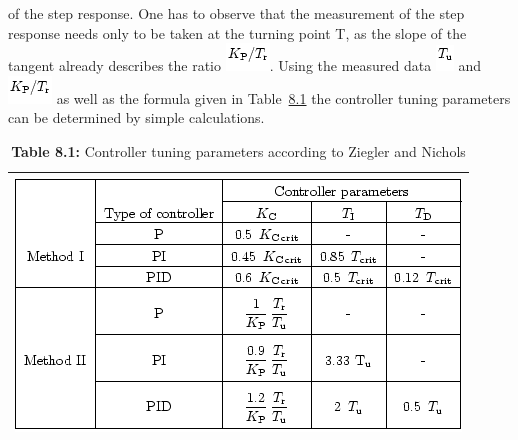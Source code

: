 \documentclass[]{article}
\begin{document}
\begin{description}
of the step response. One has to observe that the measurement of the
step response needs only to be taken at the turning point T, as the
slope of the tangent already describes the ratio
\includegraphics[width=0.45833in,height=0.29167in]{./Empirical tuning rules according to Ziegler and Nichols_files/img1248.png}.
Using the measured data
\includegraphics[width=0.18750in,height=0.27083in]{./Empirical tuning rules according to Ziegler and Nichols_files/img64.png}
and
\includegraphics[width=0.45833in,height=0.29167in]{./Empirical tuning rules according to Ziegler and Nichols_files/img1248.png}
as well as the formula given in
Table~\href{http://www.atp.ruhr-uni-bochum.de/rt1/syscontrol/node64.html\#tab:8.2.8}{8.1}
the controller tuning parameters can be determined by simple
calculations.
\end{description}

\protect\hypertarget{16311}{}{}

\begin{longtable}[]{@{}l@{}}
\caption{\textbf{Table 8.1:} Controller tuning parameters according to
Ziegler and Nichols}\tabularnewline
\toprule
\begin{minipage}[t]{0.97\columnwidth}\raggedright\strut
\protect\hypertarget{tab:8.2.8}{}{}
\includegraphics[width=4.65625in,height=2.65625in]{./Empirical tuning rules according to Ziegler and Nichols_files/img1249.png}\strut
\end{minipage}\tabularnewline
\bottomrule
\end{longtable}
\end{document}
